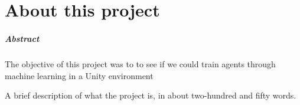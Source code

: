 
\chapter*{About this project}
\paragraph{Abstract}
The objective of this project was to to see if we could train agents through machine learning in a Unity environment

A brief description of what the project is, in about two-hundred and fifty words.